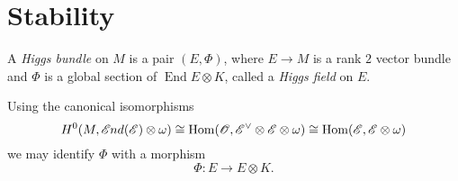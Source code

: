 \documentclass[A4paper, 12pt, british, reqno]{amsart}
\DeclareMathOperator{\Hom}{Hom}
\DeclareMathOperator{\End}{End}
\newcommand{\ot}{\otimes}
\newcommand{\op}{\oplus}
\newcommand{\dual}{^{\vee}}
\begin{document}
\section{Stability}


%
%
%

\begin{udefn}
    A \textit{Higgs bundle} on $M$ is a pair $(E,\Phi)$, where $E\to M$ is a rank $2$ vector bundle and $\Phi$ is a global section of $\End{E}\ot K$, called a \textit{Higgs field} on $E$.
\end{udefn}

\begin{urem}
    Using the canonical isomorphisms
    \[ H^{0}(M,\sEnd(\E)\ot \w)\cong \Hom(\O,\E\dual \ot \E\ot \w)\cong \Hom(\E,\E\ot \w) \]
    we may identify $\Phi$ with a morphism
    \[ \Phi\colon E\to E\ot K. \]
\end{urem}


\end{document}

